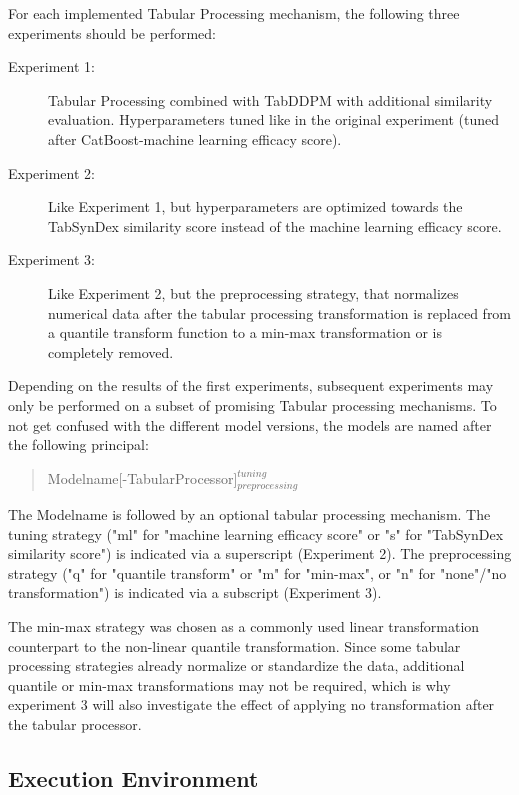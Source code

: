 \noindent For each implemented Tabular Processing mechanism, the following three experiments should be performed:

\begin{description}
	\item[Experiment 1:] Tabular Processing combined with TabDDPM with additional similarity evaluation. Hyperparameters tuned like in the original experiment (tuned after CatBoost-machine learning efficacy score).
	\item[Experiment 2:] Like Experiment 1, but hyperparameters are optimized towards the TabSynDex similarity score instead of the machine learning efficacy score.
	\item[Experiment 3:] Like Experiment 2, but the preprocessing strategy, that normalizes numerical data after the tabular processing transformation is replaced from a quantile transform function to a min-max transformation or is completely removed.
\end{description}

\noindent Depending on the results of the first experiments, subsequent experiments may only be performed on a subset of promising Tabular processing mechanisms.
To not get confused with the different model versions, the models are named after the following principal:
\begin{quote}
Modelname[-TabularProcessor]$^{tuning}_{preprocessing}$
\end{quote}
The Modelname is followed by an optional tabular processing mechanism.
The tuning strategy ("ml" for "machine learning efficacy score" or "s" for "TabSynDex similarity score") is indicated via a superscript (Experiment 2).
The preprocessing strategy ("q" for "quantile transform" or "m" for "min-max", or "n" for "none"/"no transformation") is indicated via a subscript (Experiment 3).

The min-max strategy was chosen as a commonly used linear transformation counterpart to the non-linear quantile transformation.
Since some tabular processing strategies already normalize or standardize the data, additional quantile or min-max transformations may not be required, 
which is why experiment 3 will also investigate the effect of applying no transformation after the tabular processor.

\subsection{Execution Environment}
\label{ch:environment}

